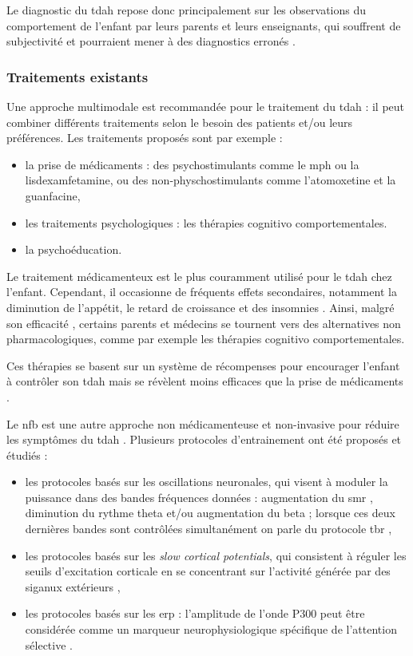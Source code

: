 Le diagnostic du \gls{tdah} repose donc principalement sur les observations du comportement de l'enfant par leurs parents et leurs enseignants, qui souffrent de
subjectivité et pourraient mener à des diagnostics erronés \citep{Lambez2019}.

\subsubsection{Traitements existants}

Une approche multimodale est recommandée pour le traitement du \gls{tdah} : il peut combiner différents traitements selon le besoin 
des patients et/ou leurs préférences. Les traitements proposés sont par exemple \citep{HAS} :
\begin{itemize}
\item la prise de médicaments : des psychostimulants comme le \gls{mph} ou la lisdexamfetamine, ou des non-physchostimulants comme l'atomoxetine 
et la guanfacine,
\item les traitements psychologiques : les thérapies cognitivo comportementales.
\item la psychoéducation.
\end{itemize} 

Le traitement médicamenteux est le plus couramment utilisé pour le \gls{tdah} chez l'enfant. Cependant, il occasionne de fréquents effets secondaires,
notamment la diminution de l'appétit, le retard de croissance et des insomnies \citep{Sousa2012}. Ainsi, malgré son efficacité \citep{Taylor2014,
Storebo2015, Swanson2017}, certains parents et médecins se tournent vers des alternatives non pharmacologiques, comme par exemple les thérapies cognitivo 
comportementales.

Ces thérapies se basent sur un système de récompenses pour encourager l'enfant à contrôler son \gls{tdah} \citep{Evans2011, Sonuga2004} mais se révèlent
moins efficaces que la prise de médicaments \citep{Sonuga-Barke2013}. 

Le \gls{nfb} est une autre approche non médicamenteuse et non-invasive pour réduire les symptômes du \gls{tdah} \citep{Arns2015, Marzbani2016}. Plusieurs
protocoles d'entrainement ont été proposés et étudiés :
\begin{itemize}
\item les protocoles basés sur les oscillations neuronales, qui visent à moduler la puissance dans des bandes fréquences données : augmentation du 
\gls{smr} \citep{Beauregard2006}, diminution du rythme theta et/ou augmentation du beta \citep{Arns2015, Kropotov2005} ; lorsque ces deux dernières 
bandes sont contrôlées simultanément on parle du protocole \gls{tbr} \citep{Lubar1976, Arns2013}, 
\item les protocoles basés sur les \textit{slow cortical potentials}, qui consistent à réguler les seuils d'excitation corticale en se concentrant sur l'activité 
générée par des siganux extérieurs \citep{Heinrich2004, Banaschewski2007},
\item les protocoles basés sur les \gls{erp} : l'amplitude de l'onde P300 peut être considérée comme un marqueur neurophysiologique spécifique de l'attention 
sélective \citep{Fouillen2017}.
\end{itemize}

